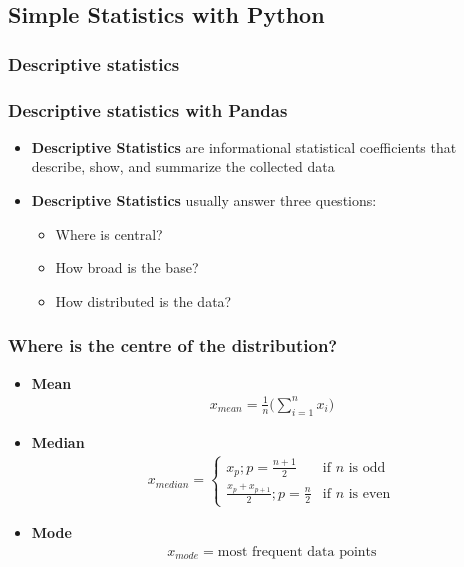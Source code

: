 \documentclass{beamer}
\begin{document}
    \subsection{Simple Statistics with Python}
    \subsubsection{Descriptive statistics}
    \begin{frame}
    \frametitle{Descriptive statistics with Pandas}
    \begin{itemize}
        \item \textbf{Descriptive Statistics} are informational statistical coefficients that describe, show, and summarize the collected data
        \item \textbf{Descriptive Statistics} usually answer three questions:
        \begin{itemize}
            \item Where is central?
            \item How broad is the base?
            \item How distributed is the data?
        \end{itemize}
    \end{itemize}
    \end{frame}

    \begin{frame}
        \frametitle{Where is the centre of the distribution?}
        \begin{itemize}
            \item \textbf{Mean}
            \begin{align*}
                x_{mean} = \frac{1}{n}\bigg(\sum_{i=1}^{n}x_{i}\bigg)
            \end{align*}
            \item \textbf{Median}
            \begin{align*}
                x_{median} = 
                \begin{cases}
                    x_{p}; p = \frac{n+1}{2} & \text{if $n$ is odd}\\
                    \frac{x_{p} + x_{p+1}}{2}; p = \frac{n}{2} & \text{if $n$ is even}
                \end{cases}
            \end{align*}
            \item \textbf{Mode}
            \begin{align*}
                x_{mode} = \text{most frequent data points}
            \end{align*}
        \end{itemize}
    \end{frame}
\end{document}
